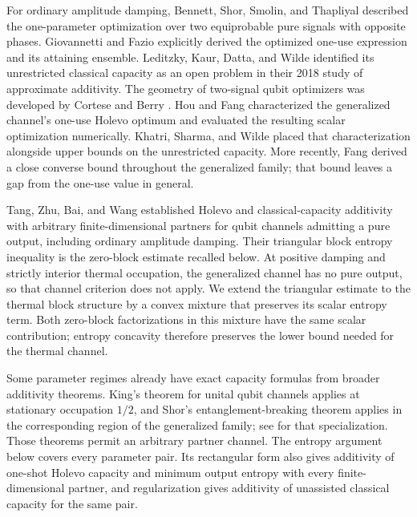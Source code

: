 \documentclass[11pt]{article}
\theoremstyle{remark}
\numberwithin{equation}{section}
\begin{document}
For ordinary amplitude damping, Bennett, Shor, Smolin, and Thapliyal
\cite[preprint, Section~III~B, Eq.~(89)]{BennettEtAl2002} described the one-parameter
optimization over two equiprobable pure signals with opposite phases.
Giovannetti and Fazio
\cite[Section~III~A, Eqs.~(42)--(43)]{GiovannettiFazio2005} explicitly
derived the optimized one-use expression and its attaining ensemble.
Leditzky, Kaur, Datta, and Wilde
\cite{LeditzkyEtAl2018} identified its unrestricted classical capacity
as an open problem in their 2018 study of approximate additivity.
The geometry of two-signal qubit optimizers was developed by Cortese
\cite[Section~7.1]{Cortese2002} and Berry \cite{Berry2005}.
Hou and Fang \cite{HouFang2007} characterized the generalized channel's
one-use Holevo optimum and evaluated the resulting scalar optimization
numerically. Khatri, Sharma, and Wilde
\cite[Section~VI]{KhatriEtAl2020} placed that characterization alongside
upper bounds on the unrestricted capacity. More recently, Fang
\cite[Theorem~1]{Fang2026} derived a close converse bound throughout the
generalized family; that bound leaves a gap from the one-use value in
general.

Tang, Zhu, Bai, and Wang
\cite[Corollary~5.1, Lemma~5.2, and Theorem~5.5]{TangEtAl2026}
established Holevo and classical-capacity additivity with arbitrary
finite-dimensional partners for qubit channels admitting a pure output,
including ordinary amplitude damping. Their triangular block entropy
inequality \cite[Theorem~4.2]{TangEtAl2026} is the zero-block estimate
recalled below. At positive damping and strictly interior thermal
occupation, the generalized channel has no pure output, so that channel
criterion does not apply. We extend the triangular estimate to the
thermal block structure by a convex mixture that preserves its scalar
entropy term. Both zero-block factorizations in this mixture have the
same scalar contribution; entropy concavity therefore preserves the
lower bound needed for the thermal channel.

Some parameter regimes already have exact capacity formulas from
broader additivity theorems. King's theorem for unital qubit channels
\cite{King2002} applies at stationary occupation $1/2$, and Shor's
entanglement-breaking theorem \cite{Shor2002} applies in the corresponding
region of the generalized family; see
\cite[Section~VI]{KhatriEtAl2020} for that specialization. Those theorems
permit an arbitrary partner channel. The entropy argument below covers
every parameter pair. Its rectangular form also gives additivity of
one-shot Holevo capacity and minimum output entropy with every
finite-dimensional partner, and regularization gives additivity of
unassisted classical capacity for the same pair.
\end{document}
